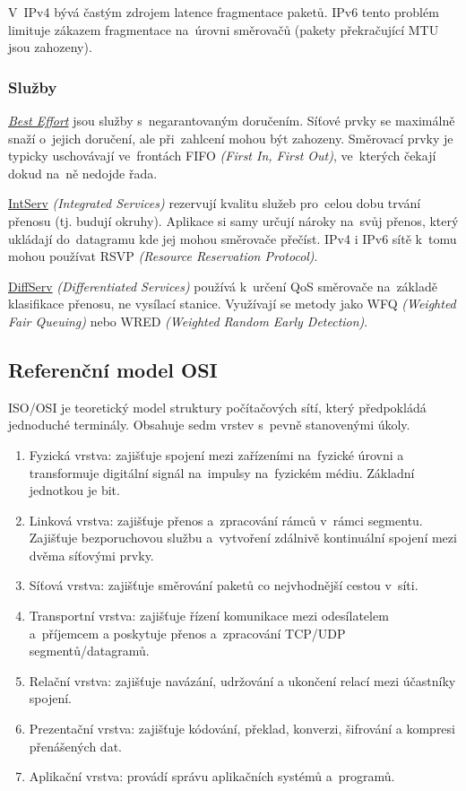 V~IPv4 bývá častým zdrojem latence fragmentace paketů.
IPv6 tento problém limituje zákazem fragmentace na~úrovni směrovačů (pakety překračující MTU jsou zahozeny).


\subsubsection{Služby}

\underline{\emph{Best Effort}} jsou služby s~negarantovaným doručením.
Síťové prvky se maximálně snaží o~jejich doručení, ale při~zahlcení mohou být zahozeny.
Směrovací prvky je typicky uschovávají ve~frontách FIFO \emph{(First In, First Out)}, ve~kterých čekají dokud na~ně nedojde řada.

\underline{IntServ} \emph{(Integrated Services)} rezervují kvalitu služeb pro~celou dobu trvání přenosu (tj. budují okruhy).
Aplikace si samy určují nároky na~svůj přenos, který ukládají do~datagramu kde jej mohou směrovače přečíst.
IPv4 i IPv6 sítě k~tomu mohou používat RSVP \emph{(Resource Reservation Protocol)}.

\underline{DiffServ} \emph{(Differentiated Services)} používá k~určení QoS směrovače na~základě klasifikace přenosu, ne vysílací stanice.
Využívají se metody jako WFQ \emph{(Weighted Fair Queuing)} nebo WRED \emph{(Weighted Random Early Detection)}.


\subsection{Referenční model OSI}

ISO/OSI je teoretický model struktury počítačových sítí, který předpokládá jednoduché terminály.
Obsahuje sedm vrstev s~pevně stanovenými úkoly.

\begin{enumerate}
    \item
          Fyzická vrstva:
          zajišťuje spojení mezi zařízeními na~fyzické úrovni a transformuje digitální signál na~impulsy na~fyzickém médiu.
          Základní jednotkou je bit.
    \item
          Linková vrstva:
          zajišťuje přenos a~zpracování rámců v~rámci segmentu.
          Zajišťuje bezporuchovou službu a~vytvoření zdálnivě kontinuální spojení mezi dvěma síťovými prvky.
    \item
          Síťová vrstva:
          zajišťuje směrování paketů co nejvhodnější cestou v~síti.
    \item
          Transportní vrstva:
          zajišťuje řízení komunikace mezi odesílatelem a~příjemcem a poskytuje přenos a~zpracování TCP/UDP segmentů/datagramů.
    \item
          Relační vrstva:
          zajišťuje navázání, udržování a ukončení relací mezi účastníky spojení.
    \item
          Prezentační vrstva:
          zajišťuje kódování, překlad, konverzi, šifrování a kompresi přenášených dat.
    \item
          Aplikační vrstva:
          provádí správu aplikačních systémů a~programů.
\end{enumerate}
\FloatBarrier



